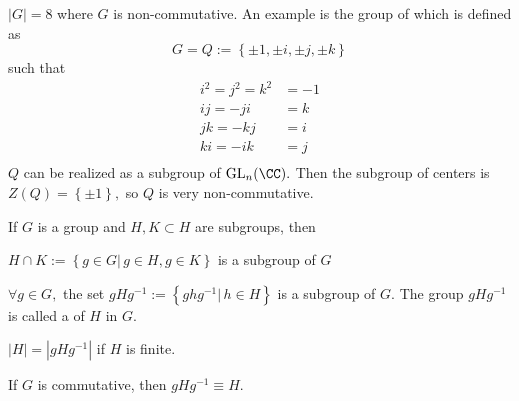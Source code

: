 \documentclass{article}
\begin{document}
\begin{example*}
	$|G|=8$ where $G$ is non-commutative. An example is the group of  which is defined as \[G=Q:=\left\{ \pm 1, \pm i, \pm j, \pm k\right\}\] such that 
	\begin{align*}
		i^2=j^2=k^2 &= -1 \\
		ij = -ji &= k \\
		jk = -kj &= i \\
		ki = -ik &= j \\
	\end{align*} $Q$ can be realized as a subgroup of $\text{GL}_n(\CC).$ Then the subgroup of centers is $Z(Q)=\left\{ \pm 1 \right\},$ so $Q$ is very non-commutative.
\end{example*}

\begin{theorem*}
	If $G$ is a group and $H, K\subset H$ are subgroups, then
	\begin{enumerate}
		\ii $H\cap K:=\left\{ g\in G|\, g\in H, g\in K \right\}$ is a subgroup of $G$

		\ii $\forall g\in G,$ the set $gHg^{-1}:=\left\{ ghg^{-1}|\, h\in H \right\}$ is a subgroup of $G.$ The group $gHg^{-1}$ is called a  of $H$ in $G.$
	\end{enumerate}
\end{theorem*}

\begin{fact*}
	$|H|=|gHg^{-1}|$ if $H$ is finite.
\end{fact*}

\begin{fact*}
	If $G$ is commutative, then $gHg^{-1}\equiv H.$
\end{fact*}
\end{document}
